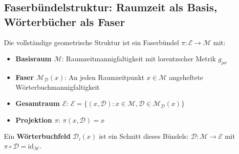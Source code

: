 \documentclass[11pt,a4paper]{article}
\begin{document}
	\subsection{Faserbündelstruktur: Raumzeit als Basis, Wörterbücher als Faser}
	Die vollständige geometrische Struktur ist ein Faserbündel $\pi: \mathcal{E} \to \mathcal{M}$ mit:
	\begin{itemize}
		\item \textbf{Basisraum $\mathcal{M}$}: Raumzeitmannigfaltigkeit mit lorentzscher Metrik $g_{\mu\nu}$
		\item \textbf{Faser $\mathcal{M}_{\mathcal{D}}(x)$}: An jeden Raumzeitpunkt $x \in \mathcal{M}$ angeheftete Wörterbuchmannigfaltigkeit
		\item \textbf{Gesamtraum $\mathcal{E}$}: $\mathcal{E} = \{(x, \mathcal{D}) : x \in \mathcal{M}, \mathcal{D} \in \mathcal{M}_{\mathcal{D}}(x)\}$
		\item \textbf{Projektion $\pi$}: $\pi(x, \mathcal{D}) = x$
	\end{itemize}
	
	Ein \textbf{Wörterbuchfeld} $\mathcal{D}_i(x)$ ist ein Schnitt dieses Bündels: $\mathcal{D}: \mathcal{M} \to \mathcal{E}$ mit $\pi \circ \mathcal{D} = \text{id}_{\mathcal{M}}$.
	
\end{document}
